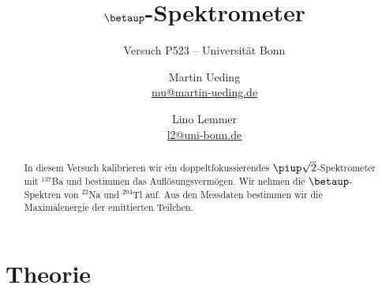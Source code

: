 

\usepackage[section]{placeins}

\usepackage{csquotes}

\usepackage{tikz}
\usetikzlibrary{chains}
\usetikzlibrary{shapes.geometric}


\usepackage{pgfplots}

\tikzexternalize


\usepackage{booktabs}

\hypersetup{
    pdftitle=
}

\subject{Praktikumsprotokoll}
\title{$\boldsymbol\betaup$-Spektrometer}
\subtitle{Versuch P523 -- Universität Bonn}
\author{
    Martin Ueding \\ \small{\href{mailto:mu@martin-ueding.de}{mu@martin-ueding.de}}
    \and
    Lino Lemmer \\
    \small{\href{mailto:l2@uni-bonn.de}{l2@uni-bonn.de}}
}

\date{}




\maketitle


\begin{abstract}
    In diesem Versuch kalibrieren wir ein doppeltfokussierendes $\piup
    \sqrt2$-Spektrometer mit $^{137}$Ba und bestimmen das Auflösungsvermögen.
    Wir nehmen die $\betaup$-Spektren von $^{22}$Na und $^{204}$Tl auf. Aus den
    Messdaten bestimmen wir die Maximalenergie der emittierten Teilchen.
\end{abstract}

\tableofcontents

\chapter{Theorie}

